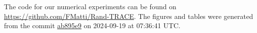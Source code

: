 The code for our numerical experiments can be found on \url{https://github.com/FMatti/Rand-TRACE}. The figures and tables were generated from the commit \href{https://github.com/FMatti/Rand-TRACE/tree/ab895e9}{ab895e9} on 2024-09-19 at 07:36:41 UTC.
